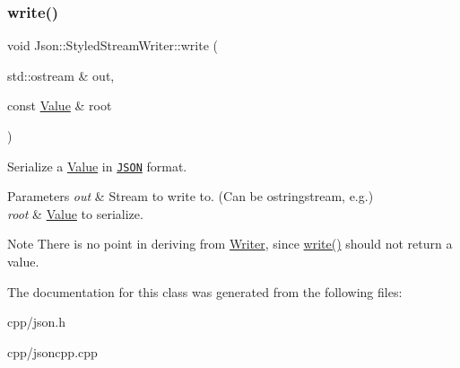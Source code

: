 \subsubsection{\texorpdfstring{write()}{write()}}
{\footnotesize\ttfamily void Json\+::\+Styled\+Stream\+Writer\+::write (\begin{DoxyParamCaption}\item[{std\+::ostream \&}]{out,  }\item[{const \hyperlink{class_json_1_1_value}{Value} \&}]{root }\end{DoxyParamCaption})}



Serialize a \hyperlink{class_json_1_1_value}{Value} in \href{http://www.json.org}{\tt J\+S\+ON} format. 


\begin{DoxyParams}{Parameters}
{\em out} & Stream to write to. (Can be ostringstream, e.\+g.) \\
\hline
{\em root} & \hyperlink{class_json_1_1_value}{Value} to serialize. \\
\hline
\end{DoxyParams}
\begin{DoxyNote}{Note}
There is no point in deriving from \hyperlink{class_json_1_1_writer}{Writer}, since \hyperlink{class_json_1_1_styled_stream_writer_a07807741c6c43ecd35885a87234d0805}{write()} should not return a value. 
\end{DoxyNote}


The documentation for this class was generated from the following files\+:\begin{DoxyCompactItemize}
\item 
cpp/json.\+h\item 
cpp/jsoncpp.\+cpp\end{DoxyCompactItemize}
